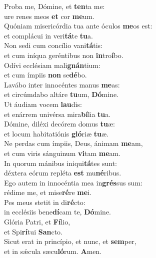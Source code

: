 \evenverse Proba me, Dómine, et \textbf{ten}ta me:~\*\\
\evenverse ure renes meos \textbf{et} cor \textbf{me}um.\\
\oddverse Quóniam misericórdia tua ante óculos \textbf{me}os est:~\*\\
\oddverse et complácui in veri\textbf{tá}te \textbf{tu}a.\\
\evenverse Non sedi cum concílio vani\textbf{tá}tis:~\*\\
\evenverse et cum iníqua geréntibus non \textbf{in}tro\textbf{í}bo.\\
\oddverse Odívi ecclésiam mali\textbf{gnán}tium:~\*\\
\oddverse et cum ímpiis \textbf{non} se\textbf{dé}bo.\\
\evenverse Lavábo inter innocéntes manus \textbf{me}as:~\*\\
\evenverse et circúmdabo altáre \textbf{tu}um, \textbf{Dó}mine.\\
\oddverse Ut áudiam vocem \textbf{lau}dis:~\*\\
\oddverse et enárrem univérsa mira\textbf{bí}lia \textbf{tu}a.\\
\evenverse Dómine, diléxi decórem domus \textbf{tu}æ:~\*\\
\evenverse et locum habitatiónis \textbf{gló}riæ \textbf{tu}æ.\\
\oddverse Ne perdas cum ímpiis, Deus, ánimam \textbf{me}am,~\*\\
\oddverse et cum viris sánguinum \textbf{vi}tam \textbf{me}am.\\
\evenverse In quorum mánibus iniqui\textbf{tá}tes sunt:~\*\\
\evenverse déxtera eórum repléta \textbf{est} mu\textbf{né}ribus.\\
\oddverse Ego autem in innocéntia mea in\textbf{grés}sus sum:~\*\\
\oddverse rédime me, et mise\textbf{ré}re \textbf{me}i.\\
\evenverse Pes meus stetit in di\textbf{ré}cto:~\*\\
\evenverse in ecclésiis bene\textbf{dí}cam te, \textbf{Dó}mine.\\
\oddverse Glória Patri, et \textbf{Fí}lio,~\*\\
\oddverse et Spi\textbf{rí}tui \textbf{San}cto.\\
\evenverse Sicut erat in princípio, et nunc, et \textbf{sem}per,~\*\\
\evenverse et in sǽcula sæcu\textbf{ló}rum. \textbf{A}men.\\

